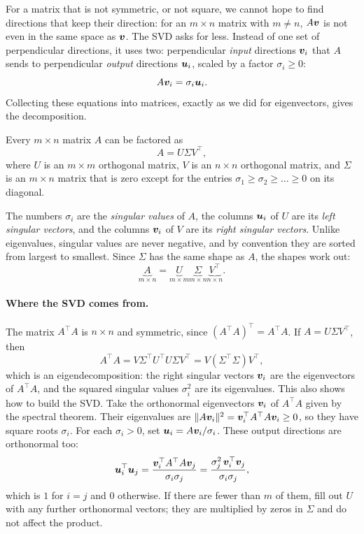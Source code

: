 For a matrix that is not symmetric, or not square, we cannot hope to find
directions that keep their direction: for an $m \times n$ matrix with
$m \ne n$, $A\bm{v}$ is not even in the same space as $\bm{v}$. The SVD
asks for less. Instead of one set of perpendicular directions, it uses
two: perpendicular \emph{input} directions $\bm{v}_i$ that $A$ sends to
perpendicular \emph{output} directions $\bm{u}_i$, scaled by a factor
$\sigma_i \ge 0$:
\begin{equation}
  A\bm{v}_i = \sigma_i \bm{u}_i .
  \label{eq:ch04-svd-pairs}
\end{equation}
Collecting these equations into matrices, exactly as we did for
eigenvectors, gives the decomposition.

\begin{theorem}
  \label{thm:svd}
  Every $m \times n$ matrix $A$ can be factored as
  \[
    A = U \Sigma V^\top ,
  \]
  where $U$ is an $m \times m$ orthogonal matrix, $V$ is an $n \times n$
  orthogonal matrix, and $\Sigma$ is an $m \times n$ matrix that is zero
  except for the entries $\sigma_1 \ge \sigma_2 \ge \dots \ge 0$ on its
  diagonal.
\end{theorem}

The numbers $\sigma_i$ are the \emph{singular values} of $A$, the columns
$\bm{u}_i$ of $U$ are its \emph{left singular vectors}, and the columns
$\bm{v}_i$ of $V$ are its \emph{right singular vectors}. Unlike
eigenvalues, singular values are never negative, and by convention they
are sorted from largest to smallest. Since $\Sigma$ has the same shape as
$A$, the shapes work out:
\[
  \underbrace{A}_{m \times n}
  = \underbrace{U}_{m \times m}
    \underbrace{\Sigma}_{m \times n}
    \underbrace{V^\top}_{n \times n} .
\]

\paragraph{Where the SVD comes from.}
The matrix $A^\top A$ is $n \times n$ and symmetric, since $(A^\top A)^\top
= A^\top A$. If $A = U\Sigma V^\top$, then
\[
  A^\top A = V \Sigma^\top U^\top U \Sigma V^\top = V (\Sigma^\top \Sigma)
  V^\top ,
\]
which is an eigendecomposition: the right singular vectors $\bm{v}_i$ are
the eigenvectors of $A^\top A$, and the squared singular values
$\sigma_i^2$ are its eigenvalues. This also shows how to build the SVD.
Take the orthonormal eigenvectors $\bm{v}_i$ of $A^\top A$ given by the
spectral theorem. Their eigenvalues are $\|A\bm{v}_i\|^2 =
\bm{v}_i^\top A^\top A \bm{v}_i \ge 0$, so they have square roots
$\sigma_i$. For each $\sigma_i > 0$, set $\bm{u}_i = A\bm{v}_i /
\sigma_i$. These output directions are orthonormal too:
\[
  \bm{u}_i^\top \bm{u}_j
  = \frac{\bm{v}_i^\top A^\top A \bm{v}_j}{\sigma_i \sigma_j}
  = \frac{\sigma_j^2\, \bm{v}_i^\top \bm{v}_j}{\sigma_i \sigma_j} ,
\]
which is $1$ for $i = j$ and $0$ otherwise. If there are fewer than $m$ of
them, fill out $U$ with any further orthonormal vectors; they are
multiplied by zeros in $\Sigma$ and do not affect the product.

